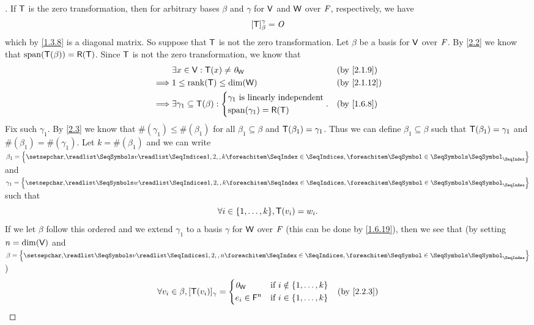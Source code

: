 \begin{proof}[]
  If \(\mathsf{T}\) is the zero transformation, then for arbitrary bases \(\beta\) and \(\gamma\) for \(\mathsf{V}\) and \(\mathsf{W}\) over \(\mathit{F}\), respectively, we have
  \[
    [\mathsf{T}]_{\beta}^{\gamma} = \mathit{O}
  \]
  which by \cref{1.3.8} is a diagonal matrix.
  So suppose that \(\mathsf{T}\) is not the zero transformation.
  Let \(\beta\) be a basis for \(\mathsf{V}\) over \(\mathit{F}\).
  By \cref{2.2} we know that \(\spn{\T(\beta)} = \rg{\T}\).
  Since \(\mathsf{T}\) is not the zero transformation, we know that
  \begin{align*}
             & \exists x \in \V : \T(x) \neq \zv_{\W}                &  & \text{(by \cref{2.1.9})}  \\
    \implies & 1 \leq \rk{\T} \leq \dim(\W)                          &  & \text{(by \cref{2.1.12})} \\
    \implies & \exists \gamma_1 \subseteq \T(\beta) : \begin{dcases}
                                                        \gamma_1 \text{ is linearly independent} \\
                                                        \spn{\gamma_1} = \rg{\T}
                                                      \end{dcases}. &  & \text{(by \cref{1.6.8})}
  \end{align*}
  Fix such \(\gamma_1\).
  By \cref{2.3} we know that \(\#(\gamma_1) \leq \#(\beta_1)\) for all \(\beta_1 \subseteq \beta\) and \(\mathsf{T}(\beta_1) = \gamma_1\).
  Thus we can define \(\beta_1 \subseteq \beta\) such that \(\mathsf{T}(\beta_1) = \gamma_1\) and \(\#(\beta_1) = \#(\gamma_1)\).
  Let \(k = \#(\beta_1)\) and we can write \(\beta_1 = \set{\seq{v}{1,2,,k}}\) and \(\gamma_1 = \set{\seq{w}{1,2,,k}}\) such that
  \[
    \forall i \in \set{1, \dots, k}, \T(v_i) = w_i.
  \]
  If we let \(\beta\) follow this ordered and we extend \(\gamma_1\) to a basis \(\gamma\) for \(\mathsf{W}\) over \(\mathit{F}\) (this can be done by \cref{1.6.19}), then we see that (by setting \(n = \dim(\mathsf{V})\) and \(\beta = \set{\seq{v}{1,2,,n}}\))
  \begin{align*}
             & \forall v_i \in \beta, [\T(v_i)]_{\gamma} = \begin{dcases}
                                                             \zv_{\W}           & \text{if } i \notin \set{1, \dots, k} \\
                                                             e_i \in \vs{F}^{n} & \text{if } i \in \set{1, \dots, k}
                                                           \end{dcases}   &  & \text{(by \cref{2.2.3})} \\

\end{align*}
\end{proof}
